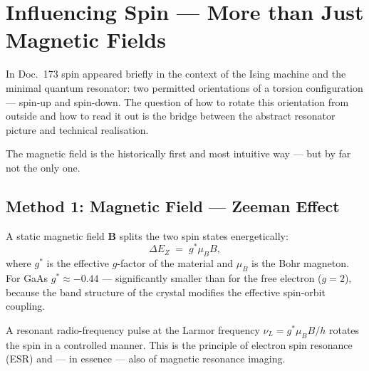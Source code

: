 
\providecommand{\ket}[1]{\left|#1\right\rangle}
\providecommand{\bra}[1]{\left\langle#1\right|}
\providecommand{\braket}[2]{\left\langle#1\middle|#2\right\rangle}

\section{Influencing Spin --- More than Just Magnetic Fields}
\label{sec:spin-manipulation}

In Doc.~173 spin appeared briefly in the context of the Ising machine and
the minimal quantum resonator: two permitted orientations
of a torsion configuration --- spin-up and spin-down.
The question of how to rotate this orientation from outside
and how to read it out is the bridge between the abstract
resonator picture and technical realisation.

The magnetic field is the historically first and most intuitive way ---
but by far not the only one.

\subsection{Method 1: Magnetic Field --- Zeeman Effect}
\label{sec:zeeman}

A static magnetic field $\mathbf{B}$ splits the two
spin states energetically:
\begin{equation}
  \Delta E_Z \;=\; g^* \mu_B B,
\end{equation}
where $g^*$ is the effective $g$-factor of the material and
$\mu_B$ is the Bohr magneton.
For GaAs $g^* \approx -0.44$ ---
significantly smaller than for the free electron ($g = 2$),
because the band structure of the crystal modifies the effective
spin-orbit coupling.

A resonant radio-frequency pulse at the Larmor frequency
$\nu_L = g^* \mu_B B / h$ rotates the spin in a controlled manner.
This is the principle of electron spin resonance (ESR)
and --- in essence --- also of magnetic resonance imaging.


